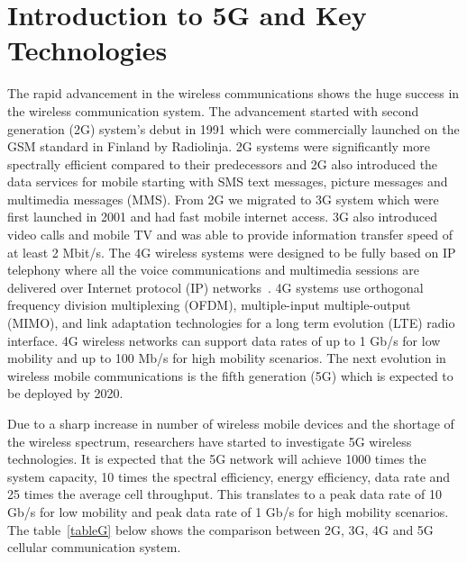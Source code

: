 \chapter{Introduction to 5G and Key Technologies}
\label{chapter2}
The rapid advancement in the wireless communications shows the huge success in the wireless communication system. The advancement started with second generation (2G) system's debut in 1991 which were commercially launched on the GSM standard in Finland by Radiolinja. 2G systems were significantly more spectrally efficient compared to their predecessors and 2G also introduced the data services for mobile starting with SMS text messages, picture messages and multimedia messages (MMS). From 2G we migrated to 3G system which were first launched in 2001 and had fast mobile internet access. 3G also introduced video calls and mobile TV and was able to provide information transfer speed of at least 2 Mbit/s. The 4G wireless systems were designed to be fully based on IP telephony where all the voice communications and multimedia sessions are delivered over Internet protocol (IP) networks~\cite{4561570}. 4G systems use orthogonal frequency division multiplexing (OFDM), multiple-input multiple-output (MIMO), and link adaptation technologies for a long term evolution (LTE) radio interface. 4G wireless networks can support data rates of up to 1 Gb/s for low mobility and up to 100 Mb/s for high mobility scenarios. The next evolution in wireless mobile communications is the fifth generation (5G) which is expected to be deployed by 2020.

Due to a sharp increase in number of wireless mobile devices and the shortage of the wireless spectrum, researchers have started to investigate 5G wireless technologies. It is expected that the 5G network will achieve 1000 times the system capacity, 10 times the spectral efficiency, energy efficiency, data rate and 25 times the average cell throughput. This translates to a peak data rate of 10 Gb/s for low mobility and peak data rate of 1 Gb/s for high mobility scenarios. The table~\ref{tableG} below shows the comparison between 2G, 3G, 4G and 5G cellular communication system. 

\begin{table*}[!ht]
\centering
\label{tableG}
\caption{Cellular Technologies Comparison between different generations of deployed digital cellular networks. Data rates, standard and implementation technology is compared for the 3G, 4G and 5G}
\end{table*}

